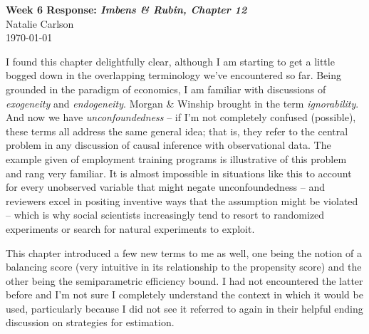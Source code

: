 \documentclass[12pt]{article}
\begin{document}
\begin{center}
  \Large \textbf{Week 6 Response: \textit{Imbens \& Rubin, Chapter 12}} \\
  \vspace{0.1in}
  \normalsize Natalie Carlson \\
  \today
\end{center}

I found this chapter delightfully clear, although I am starting to get a little bogged down in the overlapping terminology we've encountered so far. Being grounded in the paradigm of economics, I am familiar with discussions of \textit{exogeneity} and \textit{endogeneity}. Morgan \& Winship brought in the term \textit{ignorability}. And now we have \textit{unconfoundedness} -- if I'm not completely confused (possible), these terms all address the same general idea; that is, they refer to the central problem in any discussion of causal inference with observational data. The example given of employment training programs is illustrative of this problem and rang very familiar. It is almost impossible in situations like this to account for every unobserved variable that might negate unconfoundedness -- and reviewers excel in positing inventive ways that the assumption might be violated -- which is why social scientists increasingly tend to resort to randomized experiments or search for natural experiments to exploit.

This chapter introduced a few new terms to me as well, one being the notion of a balancing score (very intuitive in its relationship to the propensity score) and the other being the semiparametric efficiency bound. I had not encountered the latter before and I'm not sure I completely understand the context in which it would be used, particularly because I did not see it referred to again in their helpful ending discussion on strategies for estimation.
\end{document}
